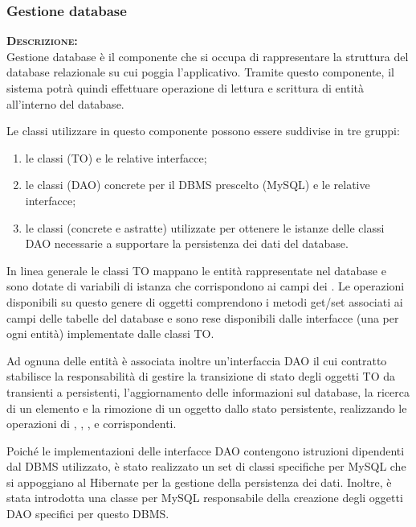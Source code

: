 \subsubsection{Gestione database}
\begin{description}
\item{\scshape\bfseries Descrizione:}\\
Gestione database è il componente che si occupa di rappresentare la struttura del database relazionale su cui poggia l'applicativo. Tramite questo componente, il sistema potrà quindi effettuare operazione di lettura e scrittura di entità all'interno del database.

Le classi utilizzare in questo componente possono essere suddivise in tre gruppi:
\begin{enumerate}
  \item le classi  (TO) e le relative interfacce;
  \item le classi  (DAO) concrete per il DBMS prescelto (MySQL) e le relative interfacce;
  \item le classi  (concrete e astratte) utilizzate per ottenere le istanze delle classi DAO necessarie a supportare la persistenza dei dati del database.
\end{enumerate}

In linea generale le classi TO mappano le entità rappresentate nel database e sono dotate di variabili di istanza che corrispondono ai campi dei . Le operazioni disponibili su questo genere di oggetti comprendono i metodi get/set associati ai campi delle tabelle del database e sono rese disponibili dalle interfacce (una per ogni entità) implementate dalle classi TO\@.

Ad ognuna delle entità è associata inoltre un'interfaccia DAO il cui contratto stabilisce la responsabilità di gestire la transizione di stato degli oggetti TO da transienti a persistenti, l'aggiornamento delle informazioni sul database, la ricerca di un elemento e la rimozione di un oggetto dallo stato persistente, realizzando le operazioni di , , ,  e  corrispondenti.

Poiché le implementazioni delle interfacce DAO contengono istruzioni dipendenti dal DBMS utilizzato, è stato realizzato un set di classi specifiche per MySQL che si appoggiano al  Hibernate per la gestione della persistenza dei dati. Inoltre, è stata introdotta una classe  per MySQL responsabile della creazione degli oggetti DAO specifici per questo DBMS\@.


\end{description}

